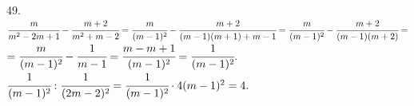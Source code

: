 49. $\cfrac{m}{m^2-2m+1}-\cfrac{m+2}{m^2+m-2}=\cfrac{m}{(m-1)^2}-\cfrac{m+2}{(m-1)(m+1)+m-1}=
\cfrac{m}{(m-1)^2}-\cfrac{m+2}{(m-1)(m+2)}=$\\$=\cfrac{m}{(m-1)^2}-\cfrac{1}{m-1}=\cfrac{m-m+1}{(m-1)^2}=\cfrac{1}{(m-1)^2}.$\\
$\cfrac{1}{(m-1)^2}:\cfrac{1}{(2m-2)^2}=\cfrac{1}{(m-1)^2}\cdot4(m-1)^2=4.$\\
